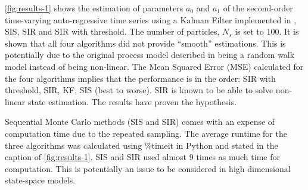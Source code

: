 \documentclass{article}
\begin{document}
\cref{fig:results-1} shows the estimation of parameters $a_0$ and $a_1$ of the second-order time-varying auto-regressive time series using a Kalman Filter implemented in \cite{lab2ans}, SIS, SIR and SIR with threshold. The number of particles, $N_s$ is set to 100. It is shown that all four algorithms did not provide ``smooth'' estimations. This is potentially due to the original process model described in \cite{lab2} being a random walk model instead of being non-linear. The Mean Squared Error (MSE) calculated for the four algorithms implies that the performance is in the order: SIR with threshold, SIR, KF, SIS (best to worse). SIR is known to be able to solve non-linear state estimation. The results have proven the hypothesis.

Sequential Monte Carlo methods (SIS and SIR) comes with an expense of computation time due to the repeated sampling. The average runtime for the three algorithms was calculated using \%timeit in Python and stated in the caption of \cref{fig:results-1}. SIS and SIR used almost 9 times as much time for computation. This is potentially an issue to be considered in high dimensional state-space models.
\end{document}

